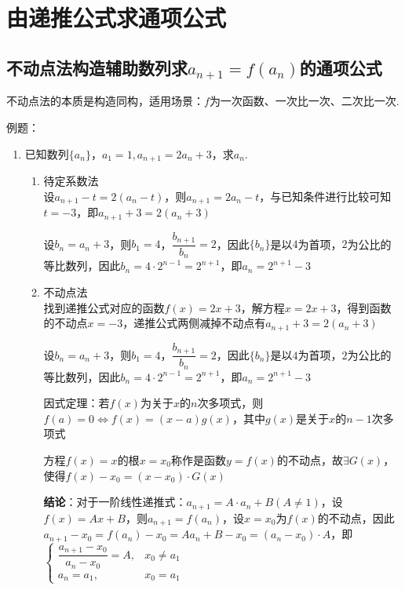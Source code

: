 \section*{由递推公式求通项公式}
\subsection*{不动点法构造辅助数列求$a_{n+1} = f(a_n)$的通项公式}
不动点法的本质是构造同构，适用场景：$f$为一次函数、一次比一次、二次比一次.

例题：
\begin{enumerate}
    \item 已知数列$\{a_n\}$，$a_1 = 1, a_{n+1} = 2a_n+3$，求$a_n$.
    \begin{jieda}
        \begin{enumerate}
            \item 待定系数法 \\
            设$a_{n+1} - t = 2(a_n-t)$，则$a_{n+1} = 2a_n - t$，与已知条件进行比较可知$t = -3$，即$a_{n+1} + 3 = 2(a_n+3)$ 

            设$b_n = a_n+3$，则$b_1 = 4$，$\dfrac{b_{n+1}}{b_n} = 2$，因此$\{b_n\}$是以$4$为首项，$2$为公比的等比数列，因此$b_n = 4\cdot 2^{n-1} = 2^{n+1}$，即$a_n = 2^{n+1} - 3$

            \item 不动点法 \\
            找到递推公式对应的函数$f(x) = 2x+3$，解方程$x = 2x+3$，得到函数的不动点$x = -3$，递推公式两侧减掉不动点有$a_{n+1} + 3 = 2(a_n+3)$ 

            设$b_n = a_n+3$，则$b_1 = 4$，$\dfrac{b_{n+1}}{b_n} = 2$，因此$\{b_n\}$是以$4$为首项，$2$为公比的等比数列，因此$b_n = 4\cdot 2^{n-1} = 2^{n+1}$，即$a_n = 2^{n+1} - 3$
            
            因式定理：若$f(x)$为关于$x$的$n$次多项式，则$f(a) = 0 \Longleftrightarrow f(x) = (x-a)g(x)$，其中$g(x)$是关于$x$的$n-1$次多项式

            方程$f(x) = x$的根$x = x_0$称作是函数$y = f(x)$的不动点，故$\exists G(x)$，使得$f(x) - x_0 = (x-x_0) \cdot G(x)$

            \textbf{结论}：对于一阶线性递推式：$a_{n+1} = A \cdot a_n+B (A \neq 1)$，设$f(x) = Ax+B$，则$a_{n+1} = f(a_n)$，设$x = x_0$为$f(x)$的不动点，因此$a_{n+1} - x_0 = f(a_n) - x_0 = Aa_n + B - x_0 = (a_n - x_0) \cdot A$，即$\left\{\begin{array}{ll}
                 \dfrac{a_{n+1}-x_0}{a_n-x_0} = A, & x_0 \neq a_1 \\
                 a_n = a_1, & x_0 = a_1
            \end{array}\right.$


\end{enumerate}
\end{jieda}
\end{enumerate}
